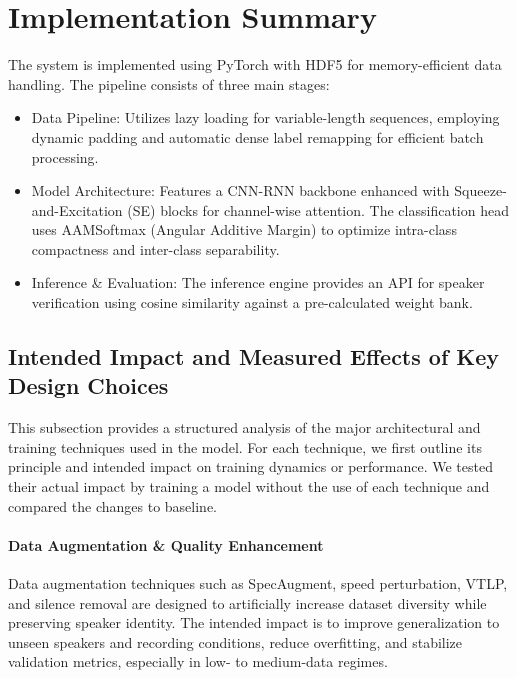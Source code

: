 \documentclass[12pt,a4paper]{article}
\begin{document}
\section{Implementation Summary}

The system is implemented using PyTorch with HDF5 for memory-efficient data handling. The pipeline consists of three main stages:

\begin{itemize}
    \item Data Pipeline: Utilizes lazy loading for variable-length sequences, employing dynamic padding and automatic dense label remapping for efficient batch processing.
    \item Model Architecture:
    Features a CNN-RNN backbone enhanced with Squeeze-and-Excitation (SE) blocks for channel-wise attention.  The classification head uses AAMSoftmax (Angular Additive Margin) to optimize intra-class compactness and inter-class separability. 
    \item Inference \& Evaluation: The inference engine provides an API for speaker verification using cosine similarity against a pre-calculated weight bank.
\end{itemize}


\subsection{Intended Impact and Measured Effects of Key Design Choices} 
This subsection provides a structured analysis of the major architectural and training techniques used in the model. For each technique, we first outline its principle and intended impact on training dynamics or performance. We tested their actual impact by training a model without the use of each technique and compared the changes to baseline.


\paragraph{Data Augmentation \& Quality Enhancement} 
Data augmentation techniques such as SpecAugment, speed perturbation, VTLP, and silence removal are designed to artificially increase dataset diversity while preserving speaker identity. The intended impact is to improve generalization to unseen speakers and recording conditions, reduce overfitting, and stabilize validation metrics, especially in low- to medium-data regimes.
\end{document}
